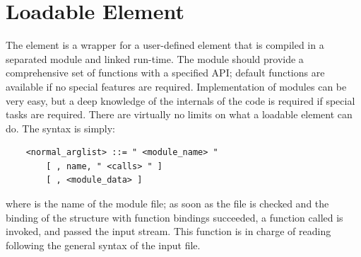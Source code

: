 \section{Loadable Element}\label{sec:EL:BASE:LOADABLE}
The  element is a wrapper for a user-defined element that is
compiled in a separated module and linked run-time.
The module should provide a comprehensive set of functions with a specified
API; default functions are available if no special features are required.
Implementation of modules can be very easy, but a deep knowledge of the
internals of the code is required if special tasks are required. 
There are virtually no limits on what a loadable element can do.
The syntax is simply:
\begin{verbatim}
    <normal_arglist> ::= " <module_name> "
        [ , name, " <calls> " ] 
        [ , <module_data> ]
\end{verbatim}
where  is the name of the module file; as soon as the file
is checked and the binding of the structure with function bindings 
succeeded, a function called  is invoked, and passed the input
stream.
This function is in charge of reading  following the
general syntax of the input file.

